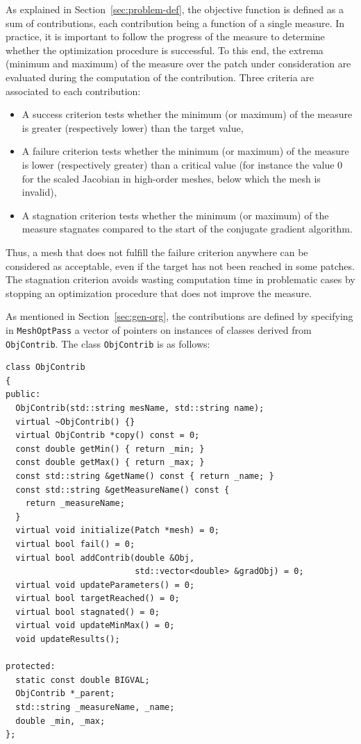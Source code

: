 \documentclass[12pt,a4paper,a4wide]{article}
\begin{document}
As explained in Section~\ref{sec:problem-def}, the objective
function is defined as a sum of contributions, each
contribution being a function of a single measure. In practice,
it is important to follow the progress of the measure to determine
whether the optimization procedure is successful. To this end, the
extrema (minimum and maximum) of the measure over the patch under
consideration are evaluated during the computation of the contribution.
Three criteria are associated to each contribution:
\begin{itemize}
\item A success criterion tests whether the minimum (or maximum)
of the measure is greater (respectively lower) than the target value,
\item A failure criterion tests whether the minimum (or maximum)
of the measure is lower (respectively greater) than a critical value
(for instance the value 0 for the scaled Jacobian in high-order meshes,
below which the mesh is invalid),
\item A stagnation criterion tests whether the minimum (or maximum)
of the measure stagnates compared to the start of the conjugate
gradient algorithm.
\end{itemize}
Thus, a mesh that does not fulfill the failure criterion anywhere can
be considered as acceptable, even if the target has not been reached
in some patches. The stagnation criterion avoids wasting
computation time in problematic cases by stopping an optimization
procedure that does not improve the measure.

As mentioned in Section~\ref{sec:gen-org}, the contributions
are defined by specifying in \texttt{MeshOptPass} a vector of
pointers on instances of classes derived from \texttt{ObjContrib}.
The class \texttt{ObjContrib} is as follows:

\begin{verbatim}
class ObjContrib
{
public:
  ObjContrib(std::string mesName, std::string name);
  virtual ~ObjContrib() {}
  virtual ObjContrib *copy() const = 0;
  const double getMin() { return _min; }
  const double getMax() { return _max; }
  const std::string &getName() const { return _name; }
  const std::string &getMeasureName() const {
    return _measureName;
  }
  virtual void initialize(Patch *mesh) = 0;
  virtual bool fail() = 0;
  virtual bool addContrib(double &Obj,
                          std::vector<double> &gradObj) = 0;
  virtual void updateParameters() = 0;
  virtual bool targetReached() = 0;
  virtual bool stagnated() = 0;
  virtual void updateMinMax() = 0;
  void updateResults();

protected:
  static const double BIGVAL;
  ObjContrib *_parent;
  std::string _measureName, _name;
  double _min, _max;
};
\end{verbatim}
\end{document}
